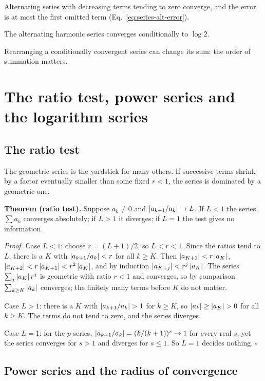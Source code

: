 \begin{keyideas}
\item Alternating series with decreasing terms tending to zero converge, and the error is at most the first omitted term (Eq.~\eqref{eq:series-alt-error}).
\item The alternating harmonic series converges conditionally to $\log2$.
\item Rearranging a conditionally convergent series can change its sum: the order of summation matters.
\end{keyideas}

\section{The ratio test, power series and the logarithm series}\label{sec:series-power}

\subsection{The ratio test}

The geometric series is the yardstick for many others. If successive terms shrink by a factor eventually smaller than some fixed $r<1$, the series is dominated by a geometric one.

\textbf{Theorem (ratio test).} Suppose $a_k\ne0$ and $\left\lvert a_{k+1}/a_k\right\rvert\to L$. If $L<1$ the series $\sum a_k$ converges absolutely; if $L>1$ it diverges; if $L=1$ the test gives no information.

\emph{Proof.} Case $L<1$: choose $r=(L+1)/2$, so $L<r<1$. Since the ratios tend to $L$, there is a $K$ with $\left\lvert a_{k+1}/a_k\right\rvert<r$ for all $k\ge K$. Then $\left\lvert a_{K+1}\right\rvert<r\left\lvert a_K\right\rvert$, $\left\lvert a_{K+2}\right\rvert<r\left\lvert a_{K+1}\right\rvert<r^2\left\lvert a_K\right\rvert$, and by induction $\left\lvert a_{K+j}\right\rvert<r^j\left\lvert a_K\right\rvert$. The series $\sum_j\left\lvert a_K\right\rvert r^j$ is geometric with ratio $r<1$ and converges, so by comparison $\sum_{k\ge K}\left\lvert a_k\right\rvert$ converges; the finitely many terms before $K$ do not matter.

Case $L>1$: there is a $K$ with $\left\lvert a_{k+1}/a_k\right\rvert>1$ for $k\ge K$, so $\left\lvert a_k\right\rvert\ge\left\lvert a_K\right\rvert>0$ for all $k\ge K$. The terms do not tend to zero, and the series diverges.

Case $L=1$: for the $p$-series, $\left\lvert a_{k+1}/a_k\right\rvert=(k/(k+1))^s\to1$ for every real $s$, yet the series converges for $s>1$ and diverges for $s\le1$. So $L=1$ decides nothing. $\square$

\subsection{Power series and the radius of convergence}

